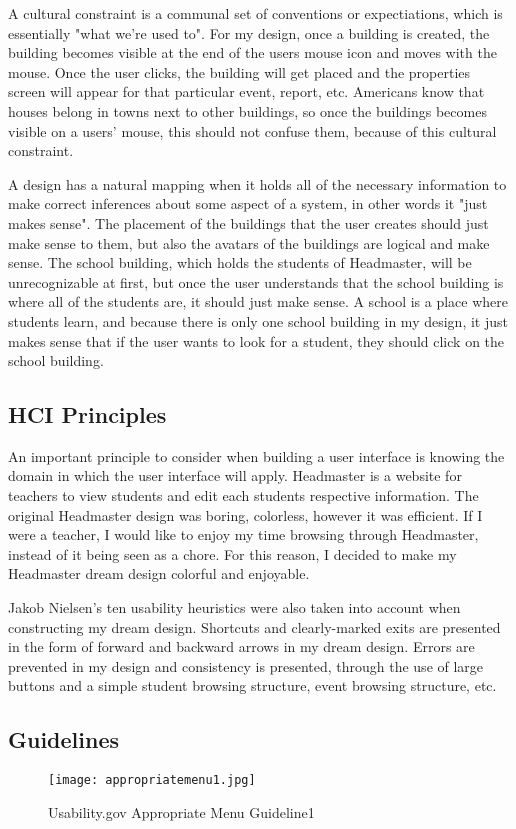 \documentclass[11pt]{article}
\begin{document}
A cultural constraint is a communal set of conventions or expectiations, which is essentially "what we're used to". For my design, once a building is created, the building becomes visible at the end of the users mouse icon and moves with the mouse. Once the user clicks, the building will get placed and the properties screen will appear for that particular event, report, etc. Americans know that houses belong in towns next to other buildings, so once the buildings becomes visible on a users' mouse, this should not confuse them, because of this cultural constraint. 

A design has a natural mapping when it holds all of the necessary information to make correct inferences about some aspect of a system, in other words it "just makes sense". The placement of the buildings that the user creates should just make sense to them, but also the avatars of the buildings are logical and make sense. The school building, which holds the students of Headmaster, will be unrecognizable at first, but once the user understands that the school building is where all of the students are, it should just make sense. A school is a place where students learn, and because there is only one school building in my design, it just makes sense that if the user wants to look for a student, they should click on the school building. 

\subsection{HCI Principles}
An important principle to consider when building a user interface is knowing the domain in which the user interface will apply. Headmaster is a website for teachers to view students and edit each students respective information. The original Headmaster design was boring, colorless, however it was efficient. If I were a teacher, I would like to enjoy my time browsing through Headmaster, instead of it being seen as a chore. For this reason, I decided to make my Headmaster dream design colorful and enjoyable. 

Jakob Nielsen's ten usability heuristics \cite{usability} were also taken into account when constructing my dream design. Shortcuts and clearly-marked exits are presented in the form of forward and backward arrows in my dream design. Errors are prevented in my design and consistency is presented, through the use of large buttons and a simple student browsing structure, event browsing structure, etc.

\subsection{Guidelines}
\begin{figure}[h]
\centering
\texttt{[image: appropriatemenu1.jpg]}
\caption{Usability.gov Appropriate Menu Guideline1}
\label{menu1}
\end{figure}
\end{document}
